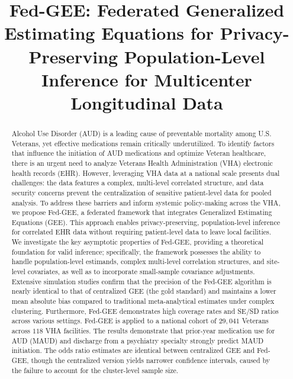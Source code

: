 \documentclass[useAMS,referee, usegraphicx]{biom}
\title[Fed-GEE: Federated GEE for Privacy-Preserving Inference]{Fed-GEE: Federated Generalized Estimating Equations for Privacy-Preserving Population-Level Inference for Multicenter Longitudinal Data}
\newcounter{soumikcount}
\newcommand{\soumik}[1]{%
    \stepcounter{soumikcount}%
    \textcolor{teal}{(\texttt{#1})}%
    \addcontentsline{smk}{soumikitem}{\protect\numberline{\thesoumikcount.}#1}%
}
\begin{document}
\vspace{2em}
\newpage

\pagerange{\pageref{firstpage}--\pageref{lastpage}}

\label{firstpage}

\begin{abstract}
Alcohol Use Disorder (AUD) is a leading cause of preventable mortality among U.S. Veterans, yet effective medications remain critically underutilized. To identify factors that influence the initiation of AUD medications and optimize Veteran healthcare, there is an urgent need to analyze Veterans Health Administration (VHA) electronic health records (EHR). However, leveraging VHA data at a national scale presents dual challenges: the data features a complex, multi-level correlated structure, and data security concerns prevent the centralization of sensitive patient-level data for pooled analysis.
To address these barriers and inform systemic policy-making across the VHA, we propose Fed-GEE, a federated framework that integrates Generalized Estimating Equations (GEE). This approach enables privacy-preserving, population-level inference for correlated EHR data without requiring patient-level data to leave local facilities. We investigate the key asymptotic properties of Fed-GEE, providing a theoretical foundation for valid inference; specifically, the framework possesses the ability to handle population-level estimands, complex multi-level correlation structures, and site-level covariates, as well as to incorporate small-sample covariance adjustments. 
Extensive simulation studies confirm that the precision of the Fed-GEE algorithm is nearly identical to that of centralized GEE (the gold standard) and maintains a lower mean absolute bias compared to traditional meta-analytical estimates under complex clustering. Furthermore, Fed-GEE demonstrates high coverage rates and SE/SD ratios across various settings.
Fed-GEE is applied to a national cohort of $29,041$ Veterans across $118$ VHA facilities. The results demonstrate that prior-year medication use for AUD (MAUD) and discharge from a psychiatry specialty strongly predict MAUD initiation. The odds ratio estimates are identical between centralized GEE and Fed-GEE, though the centralized version yields narrower confidence intervals, caused by the failure to account for the cluster-level sample size.

\end{abstract}
\end{document}
